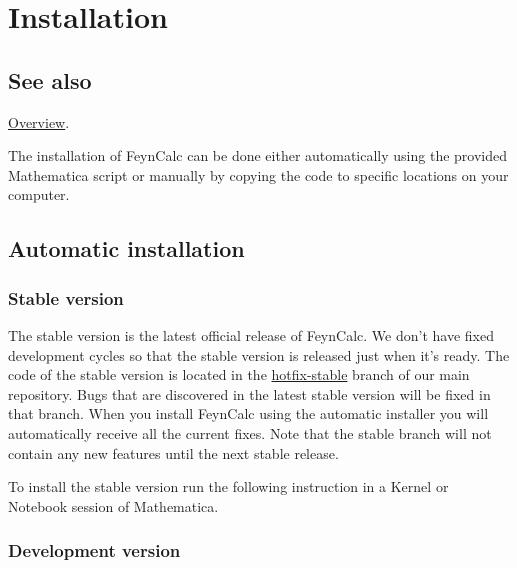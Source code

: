 \documentclass[../FeynCalcManual.tex]{subfiles}
\begin{document}
\hypertarget{installation}{
\section{Installation}\label{installation}}

\subsection{See also}

\hyperlink{toc}{Overview}.

The installation of FeynCalc can be done either automatically using the
provided Mathematica script or manually by copying the code to specific
locations on your computer.

\subsection{Automatic installation}\label{automatic-installation}

\subsubsection{Stable version}\label{stable-version}

The stable version is the latest official release of FeynCalc. We don't
have fixed development cycles so that the stable version is released
just when it's ready. The code of the stable version is located in the
\href{https://github.com/FeynCalc/feyncalc/tree/hotfix-stable}{hotfix-stable}
branch of our main repository. Bugs that are discovered in the latest
stable version will be fixed in that branch. When you install FeynCalc
using the automatic installer you will automatically receive all the
current fixes. Note that the stable branch will not contain any new
features until the next stable release.

To install the stable version run the following instruction in a Kernel
or Notebook session of Mathematica.

\begin{Shaded}
\begin{Highlighting}[]
\OperatorTok{[}\OperatorTok{]}
\OperatorTok{[]}
\end{Highlighting}
\end{Shaded}

\subsubsection{Development version}\label{development-version}
\end{document}
